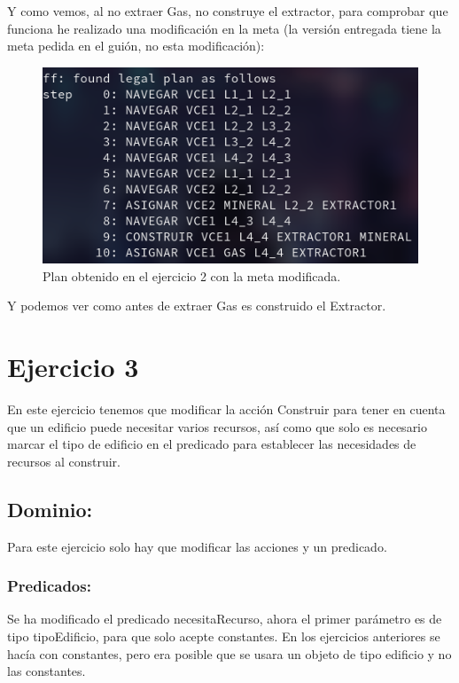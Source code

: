 \documentclass[10pt, spanish]{article}
\begin{document}
\begin{multicols}{2}

Y como vemos, al no extraer Gas, no construye el extractor, para comprobar que funciona he realizado una modificación en la meta (la versión entregada tiene la meta pedida en el guión, no esta modificación):


\begin{figure}[H]
	\centering
	\includegraphics[scale=0.3]{plan2Gas.png}
	\caption{Plan obtenido en el ejercicio 2 con la meta modificada.}
	\label{plan2Gas}
\end{figure}
\end{multicols}

Y podemos ver como antes de extraer Gas es construido el Extractor.

\section{Ejercicio 3}

En este ejercicio tenemos que modificar la acción Construir para tener en cuenta que un edificio puede necesitar varios recursos, así como que solo es necesario marcar el tipo de edificio en el predicado para establecer las necesidades de recursos al construir.

\subsection{Dominio:}

Para este ejercicio solo hay que modificar las acciones y un predicado.

\subsubsection{Predicados:}

Se ha modificado el predicado necesitaRecurso, ahora el primer parámetro es de tipo tipoEdificio, para que solo acepte constantes. En los ejercicios anteriores se hacía con constantes, pero era posible que se usara un objeto de tipo edificio y no las constantes.
\end{document}
